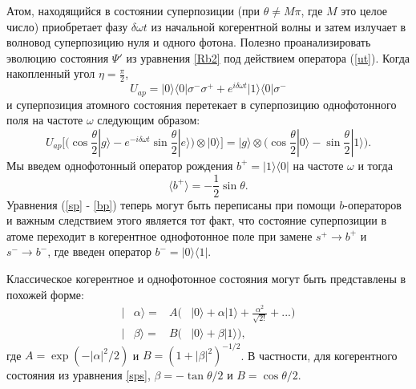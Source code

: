 Атом, находящийся в состоянии суперпозиции (при $\theta \neq M \pi$, где $M$ это целое число) приобретает фазу $\delta\omega t$ из начальной когерентной волны \cite{Astafiev2010resonance,abdumalikov2011dynamics} и затем излучает в волновод суперпозицию нуля и одного фотона. 
Полезно проанализировать эволюцию состояния $\Psi'$ из уравнения \eqref{Rb2} под действием оператора (\ref{ut}). Когда накопленный угол $\eta = \frac{\pi}{2}$, %
\begin{equation}
	U_{ap} = |0\rangle\langle0| \sigma^-\sigma^+ + e^{i\delta\omega t} |1\rangle\langle 0 | \sigma^-
	\label{Uap}
\end{equation} 
и суперпозиция атомного состояния перетекает в суперпозицию однофотонного поля на частоте $\omega$ следующим образом:    
\begin{equation}
	U_{ap} \bigg[ \bigg(\cos{\frac{\theta}{2}} |g\rangle - e^{-i\delta\omega t} \sin{\frac{\theta}{2}} |e\rangle\bigg) \otimes |0\rangle \bigg] =  
	|g\rangle \otimes \bigg(\cos{\frac{\theta}{2}} |0\rangle - \sin{\frac{\theta}{2}} |1\rangle\bigg).
	\label{sps}
\end{equation} 
Мы введем однофотонный оператор рождения $b^+ = |1\rangle\langle0|$  на частоте $\omega$ и тогда
\begin{equation}
	\langle b^+\rangle = -\frac{1}{2}\sin\theta. 
	\label{bp}
\end{equation}
Уравнения (\ref{sp} - \ref{bp}) теперь могут быть переписаны при помощи $b$-операторов и важным следствием этого является тот факт, что состояние суперпозиции в атоме переходит в когерентное однофотонное поле при замене $s^+ \rightarrow b^+$ и $s^- \rightarrow b^-$, где введен оператор $b^- = |0\rangle\langle 1|$. 


Классическое когерентное и однофотонное состояния могут быть представлены в похожей форме: 
\begin{subequations}
	\begin{alignat}{2}
		|&\alpha\rangle = & A \bigg( & |0\rangle + \alpha |1\rangle + \frac{\alpha^2}{\sqrt{2!}} + ...\bigg)\\
		|&\beta\rangle = & B \big( & |0\rangle + \beta |1\rangle\big),
	\end{alignat}
\end{subequations}
где $A=\exp{(-|\alpha|^2/2)}$ и $B=(1+|\beta|^2)^{-1/2}$. В частности, для когерентного состояния из уравнения \eqref{sps}, $\beta = -\tan \theta/2$ и $B=\cos \theta/2$. 

